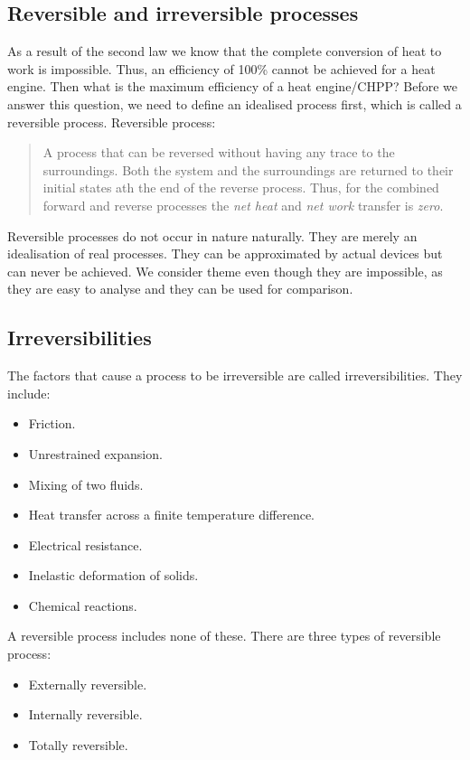 \documentclass[class=report, crop=false, 12pt,a4paper]{standalone}
\begin{document}
\subsection{Reversible and irreversible processes}
As a result of the second law we know that the complete conversion of heat to work is impossible. Thus, an efficiency of 100\% cannot be achieved for a heat engine. Then what is the maximum efficiency of a heat engine/CHPP? Before we answer this question, we need to define an idealised process first, which is called a reversible process.
Reversible process:
\begin{quote}
  \begin{center}
    A process that can be reversed without having any trace to the surroundings. Both the system and the surroundings are returned to their initial states ath the end of the reverse process. Thus, for the combined forward and reverse processes the \emph{net heat} and \emph{net work} transfer is \emph{zero}.
  \end{center}
\end{quote}
Reversible processes do not occur in nature naturally. They are merely an idealisation of real processes. They can be approximated by actual devices but can never be achieved. We consider theme even though they are impossible, as they are easy to analyse and they can be used for comparison.
\subsection{Irreversibilities}
The factors that cause a process to be irreversible are called irreversibilities. 
They include:
\begin{itemize}[noitemsep]
  \item Friction.
  \item Unrestrained expansion.
  \item Mixing of two fluids.
  \item Heat transfer across a finite temperature difference.
  \item Electrical resistance.
  \item Inelastic deformation of solids.
  \item Chemical reactions.
\end{itemize}
A reversible process includes none of these. There are three types of reversible process:
\begin{itemize}[noitemsep]
  \item Externally reversible.
  \item Internally reversible.
  \item Totally reversible.
\end{itemize}
\end{document}
